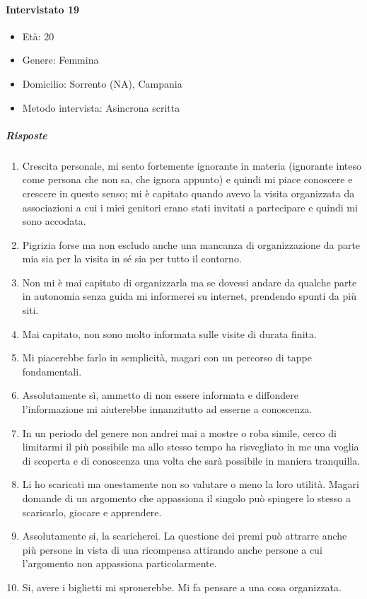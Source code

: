 \documentclass{article}
\begin{document}
\paragraph{Intervistato 19}
\begin{itemize}
\item Età: 20
\item Genere: Femmina
\item Domicilio: Sorrento (NA), Campania
\item Metodo intervista: Asincrona scritta
\end{itemize}
\subparagraph{Risposte}
\begin{enumerate}
\item Crescita personale, mi sento fortemente ignorante in materia (ignorante inteso come persona che non sa, che ignora appunto) e quindi mi piace conoscere e crescere in questo senso; mi è capitato quando avevo la visita organizzata da associazioni a cui i miei genitori erano stati invitati a partecipare e quindi mi sono accodata.
\item Pigrizia forse ma non escludo anche una mancanza di organizzazione da parte mia sia per la visita in sé sia per tutto il contorno.
\item Non mi è mai capitato di organizzarla ma se dovessi andare da qualche parte in autonomia senza guida mi informerei su internet, prendendo spunti da più siti.
\item Mai capitato, non sono molto informata sulle visite di durata finita.
\item Mi piacerebbe farlo in semplicità, magari con un percorso di tappe fondamentali.
\item Assolutamente sì, ammetto di non essere informata e diffondere l'informazione mi aiuterebbe innanzitutto ad esserne a conoscenza.
\item In un periodo del genere non andrei mai a mostre o roba simile, cerco di limitarmi il più possibile ma allo stesso tempo ha risvegliato in me una voglia di scoperta e di conoscenza una volta che sarà possibile in maniera tranquilla.
\item Li ho scaricati ma onestamente non so valutare o meno la loro utilità. Magari domande di un argomento che appassiona il singolo può spingere lo stesso a scaricarlo, giocare e apprendere.
\item Assolutamente si, la scaricherei. La questione dei premi può attrarre anche più persone in vista di una ricompensa attirando anche persone a cui l'argomento non appassiona particolarmente.
\item Si, avere i biglietti mi spronerebbe. Mi fa pensare a una cosa organizzata.
\end{enumerate}
\end{document}
